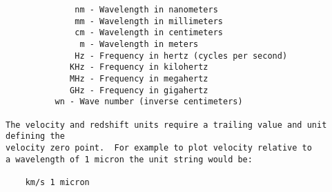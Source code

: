 \begin{verbatim}
	          nm - Wavelength in nanometers
	          mm - Wavelength in millimeters
	          cm - Wavelength in centimeters
	           m - Wavelength in meters
	          Hz - Frequency in hertz (cycles per second)
	         KHz - Frequency in kilohertz
	         MHz - Frequency in megahertz
	         GHz - Frequency in gigahertz
		  wn - Wave number (inverse centimeters)

The velocity and redshift units require a trailing value and unit defining the
velocity zero point.  For example to plot velocity relative to
a wavelength of 1 micron the unit string would be:

	km/s 1 micron
\end{verbatim}
\endgroup
